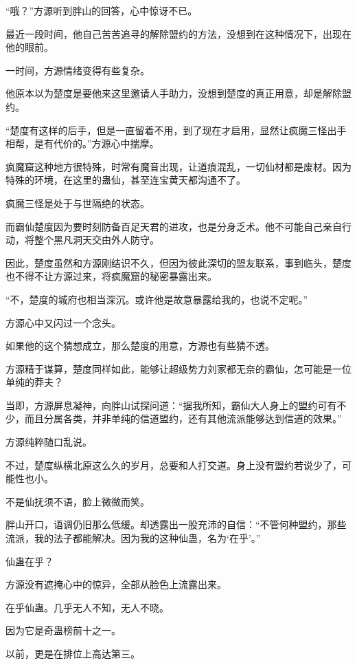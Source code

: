 
\begin{this_body}

“哦？”方源听到胖山的回答，心中惊讶不已。

最近一段时间，他自己苦苦追寻的解除盟约的方法，没想到在这种情况下，出现在他的眼前。

一时间，方源情绪变得有些复杂。

他原本以为楚度是要他来这里邀请人手助力，没想到楚度的真正用意，却是解除盟约。

“楚度有这样的后手，但是一直留着不用，到了现在才启用，显然让疯魔三怪出手相帮，是有代价的。”方源心中揣摩。

疯魔窟这种地方很特殊，时常有魔音出现，让道痕混乱，一切仙材都是废材。因为特殊的环境，在这里的蛊仙，甚至连宝黄天都沟通不了。

疯魔三怪是处于与世隔绝的状态。

而霸仙楚度因为要时刻防备百足天君的进攻，也是分身乏术。他不可能自己亲自行动，将整个黑凡洞天交由外人防守。

因此，楚度虽然和方源刚结识不久，但因为彼此深切的盟友联系，事到临头，楚度也不得不让方源过来，将疯魔窟的秘密暴露出来。

“不，楚度的城府也相当深沉。或许他是故意暴露给我的，也说不定呢。”

方源心中又闪过一个念头。

如果他的这个猜想成立，那么楚度的用意，方源也有些猜不透。

方源精于谋算，楚度同样如此，能够让超级势力刘家都无奈的霸仙，怎可能是一位单纯的莽夫？

当即，方源屏息凝神，向胖山试探问道：“据我所知，霸仙大人身上的盟约可有不少，而且分属各类，并非单纯的信道盟约，还有其他流派能够达到信道的效果。”

方源纯粹随口乱说。

不过，楚度纵横北原这么久的岁月，总要和人打交道。身上没有盟约若说少了，可能性也小。

不是仙抚须不语，脸上微微而笑。

胖山开口，语调仍旧那么低缓。却透露出一股充沛的自信：“不管何种盟约，那些流派，我的法子都能解决。因为我的这种仙蛊，名为‘在乎’。”

仙蛊在乎？

方源没有遮掩心中的惊异，全部从脸色上流露出来。

在乎仙蛊。几乎无人不知，无人不晓。

因为它是奇蛊榜前十之一。

以前，更是在排位上高达第三。


\end{this_body}
